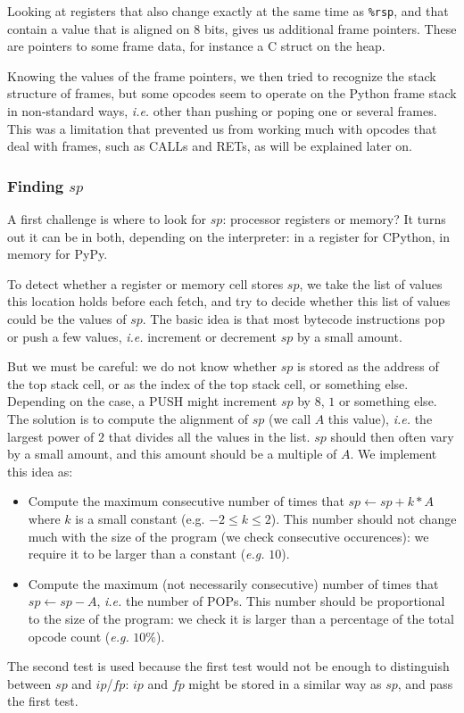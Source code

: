 \documentclass[english]{article}
\begin{document}
Looking at registers that also change exactly at the same time as \texttt{\%rsp}, and that contain a value that is aligned on 8 bits, gives us additional frame pointers. These are pointers to some frame data, for instance a C struct on the heap.

Knowing the values of the frame pointers, we then tried to recognize the stack structure of frames, but some opcodes seem to operate on the Python frame stack in non-standard ways, \textit{i.e.} other than pushing or poping one or several frames. This was a limitation that prevented us from working much with opcodes that deal with frames, such as CALLs and RETs, as will be explained later on.

\subsubsection{Finding $sp$}

A first challenge is where to look for $sp$: processor registers or memory? It turns out it can be in both, depending on the interpreter: in a register for CPython, in memory for PyPy. 

To detect whether a register or memory cell stores $sp$, we take the list of values this location holds before each fetch, and try to decide whether this list of values could be the values of $sp$. The basic idea is that most bytecode instructions pop or push a few values, \textit{i.e.} increment or decrement $sp$ by a small amount.

But we must be careful: we do not know whether $sp$ is stored as the address of the top stack cell, or as the index of the top stack cell, or something else. Depending on the case, a PUSH might increment $sp$ by $8$, $1$ or something else. The solution is to compute the alignment of $sp$ (we call $A$ this value), \textit{i.e.} the largest power of $2$ that divides all the values in the list. $sp$ should then often vary by a small amount, and this amount should be a multiple of $A$. We implement this idea as:
\begin{itemize}
	\item Compute the maximum consecutive number of times that $sp \leftarrow sp + k*A$ where $k$ is a small constant (e.g. $-2 \leq k \leq 2$). This number should not change much with the size of the program (we check consecutive occurences): we require it to be larger than a constant (\textit{e.g.} $10$).
	\item Compute the maximum (not necessarily consecutive) number of times that $sp \leftarrow sp - A$, \textit{i.e.} the number of POPs. This number should be proportional to the size of the program: we check it is larger than a percentage of the total opcode count (\textit{e.g.} $10\%$).
\end{itemize}
The second test is used because the first test would not be enough to distinguish between $sp$ and $ip$/$fp$: $ip$ and $fp$ might be stored in a similar way as $sp$, and pass the first test. 
\end{document}
